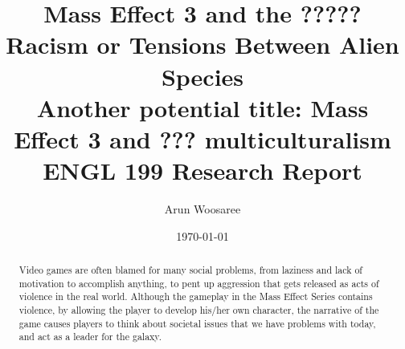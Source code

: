 \documentclass[journal]{IEEEtran}
\title{Mass Effect 3 and the ????? Racism or Tensions Between Alien Species\\
Another potential title: Mass Effect 3 and ??? multiculturalism\\
\vspace{.25cm}\large ENGL 199 Research Report \vspace{-.5cm}}
\author{\LARGE Arun Woosaree}
\date{\today}
\begin{document}
\maketitle %

\begin{abstract}
 Video games are often blamed for many social problems, from laziness and lack of motivation to accomplish anything, to pent up aggression that gets released as acts of violence in the real world. Although the gameplay in the Mass Effect Series contains violence, by allowing the player to develop his/her own character, the narrative of the game causes players to think about societal issues that we have problems with today, and act as a leader for the galaxy.
\end{abstract}

\end{document}
